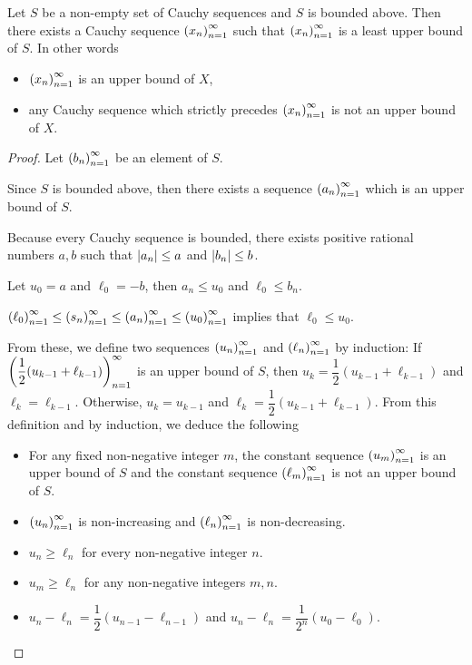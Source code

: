 \begin{theorem}\label{theorem:chapter1:cauchy-sequence-least-upper-bound}
    Let $S$ be a non-empty set of Cauchy sequences and $S$ is bounded above. Then there exists a Cauchy sequence ${\left({x_{n}}\right)}^{\infty}_{n=1}$ such that ${\left({x_{n}}\right)}^{\infty}_{n=1}$ is a least upper bound of $S$. In other words
    \begin{itemize}[itemsep=0pt]
        \item ${\left({x_{n}}\right)}^{\infty}_{n=1}$ is an upper bound of $X$,
        \item any Cauchy sequence which strictly precedes ${\left({x_{n}}\right)}^{\infty}_{n=1}$ is not an upper bound of $X$.
    \end{itemize}
\end{theorem}

\begin{proof}
    Let ${\left({b_{n}}\right)}^{\infty}_{n=1}$ be an element of $S$.

    Since $S$ is bounded above, then there exists a sequence ${\left({a_{n}}\right)}^{\infty}_{n=1}$ which is an upper bound of $S$.

    Because every Cauchy sequence is bounded, there exists positive rational numbers $a, b$ such that $\left\vert{a_{n}}\right\vert\le a$ and $\left\vert{b_{n}}\right\vert\le b$.

    Let $u_{0} = a$ and $\ell_{0} = -b$, then $a_{n} \le u_{0}$ and $\ell_{0} \le b_{n}$.

    ${\left({\ell_{0}}\right)}^{\infty}_{n=1} \le {\left({s_{n}}\right)}^{\infty}_{n=1} \le {\left({a_{n}}\right)}^{\infty}_{n=1} \le {\left({u_{0}}\right)}^{\infty}_{n=1}$ implies that $\ell_{0} \le u_{0}$.

    From these, we define two sequences ${\left({u_{n}}\right)}^{\infty}_{n=1}$ and ${\left({\ell_{n}}\right)}^{\infty}_{n=1}$ by induction: If ${\left({\dfrac{1}{2}(u_{k-1} + \ell_{k-1})}\right)}^{\infty}_{n=1}$ is an upper bound of $S$, then $u_{k} = \dfrac{1}{2}(u_{k-1} + \ell_{k-1})$ and $\ell_{k} = \ell_{k-1}$. Otherwise, $u_{k} = u_{k-1}$ and $\ell_{k} = \dfrac{1}{2}(u_{k-1} + \ell_{k-1})$. From this definition and by induction, we deduce the following
    \begin{itemize}[itemsep=0pt]
        \item For any fixed non-negative integer $m$, the constant sequence ${\left({u_{m}}\right)}^{\infty}_{n=1}$ is an upper bound of $S$ and the constant sequence ${\left({\ell_{m}}\right)}^{\infty}_{n=1}$ is not an upper bound of $S$.
        \item ${\left({u_{n}}\right)}^{\infty}_{n=1}$ is non-increasing and ${\left({\ell_{n}}\right)}^{\infty}_{n=1}$ is non-decreasing.
        \item $u_{n} \ge \ell_{n}$ for every non-negative integer $n$.
        \item $u_{m} \ge \ell_{n}$ for any non-negative integers $m, n$.
        \item $u_{n} - \ell_{n} = \dfrac{1}{2}(u_{n-1} - \ell_{n-1})$ and $u_{n} - \ell_{n} = \dfrac{1}{2^{n}}(u_{0} - \ell_{0})$.
    \end{itemize}


\end{proof}
